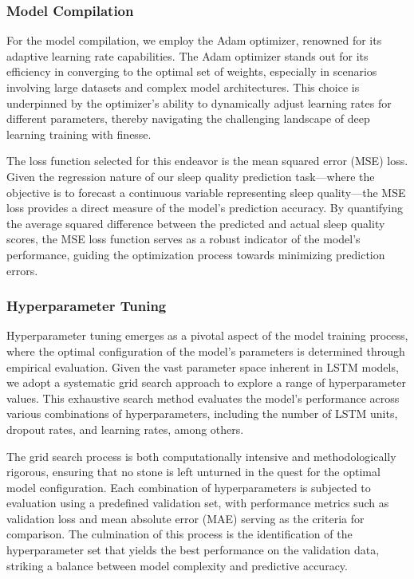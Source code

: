 \documentclass[10pt]{extarticle}
\begin{document}
\subsubsection{Model Compilation}

For the model compilation, we employ the Adam optimizer, renowned for its adaptive learning rate capabilities. The Adam optimizer stands out for its efficiency in converging to the optimal set of weights, especially in scenarios involving large datasets and complex model architectures. This choice is underpinned by the optimizer's ability to dynamically adjust learning rates for different parameters, thereby navigating the challenging landscape of deep learning training with finesse.

The loss function selected for this endeavor is the mean squared error (MSE) loss. Given the regression nature of our sleep quality prediction task—where the objective is to forecast a continuous variable representing sleep quality—the MSE loss provides a direct measure of the model's prediction accuracy. By quantifying the average squared difference between the predicted and actual sleep quality scores, the MSE loss function serves as a robust indicator of the model's performance, guiding the optimization process towards minimizing prediction errors.

\subsubsection{Hyperparameter Tuning}

Hyperparameter tuning emerges as a pivotal aspect of the model training process, where the optimal configuration of the model's parameters is determined through empirical evaluation. Given the vast parameter space inherent in LSTM models, we adopt a systematic grid search approach to explore a range of hyperparameter values. This exhaustive search method evaluates the model's performance across various combinations of hyperparameters, including the number of LSTM units, dropout rates, and learning rates, among others.

The grid search process is both computationally intensive and methodologically rigorous, ensuring that no stone is left unturned in the quest for the optimal model configuration. Each combination of hyperparameters is subjected to evaluation using a predefined validation set, with performance metrics such as validation loss and mean absolute error (MAE) serving as the criteria for comparison. The culmination of this process is the identification of the hyperparameter set that yields the best performance on the validation data, striking a balance between model complexity and predictive accuracy.
\end{document}
